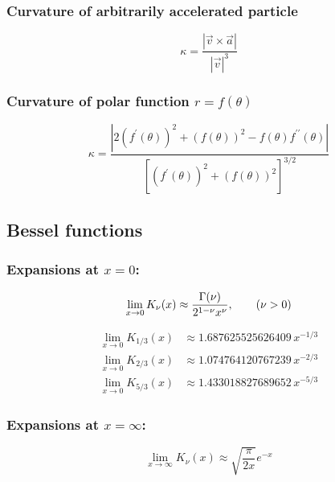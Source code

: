 \documentclass{article}
\begin{document}
\subsubsection{Curvature of arbitrarily accelerated particle}

\begin{equation}
    \kappa = \frac{|\vec{v}\times\vec{a}|}{|\vec{v}|^3}
\end{equation}

\subsubsection{Curvature of polar function $r = f(\theta)$}

\begin{equation}
    \kappa = \frac{|2(f^\prime(\theta))^2 + (f(\theta))^2 - f(\theta)f^{\prime\prime}(\theta)|}{\left[(f^\prime(\theta))^2 + (f(\theta))^2\right]^{3/2}}
    \label{eqn:curvature_polar}
\end{equation}

\subsection{Bessel functions}

\subsubsection{Expansions at $x=0$:}

\begin{equation}
    \lim_{x\rightarrow0} K_\nu(x)
        \approx \frac{\Gamma(\nu)}{2^{1-\nu}x^\nu}, \qquad (\nu > 0) \\
\end{equation}

\begin{align}
    \lim_{x\rightarrow0} K_{1/3}(x)
        &\approx 1.687625525626409\,x^{-1/3} \\
    \lim_{x\rightarrow0} K_{2/3}(x)
        &\approx 1.074764120767239\,x^{-2/3} \\
    \lim_{x\rightarrow0} K_{5/3}(x)
        &\approx 1.433018827689652\,x^{-5/3}
\end{align}

\subsubsection{Expansions at $x=\infty$:}

\begin{equation}
    \lim_{x\rightarrow\infty} K_\nu(x)
        \approx \sqrt{\frac{\pi}{2x}}e^{-x}
\end{equation}
\end{document}

